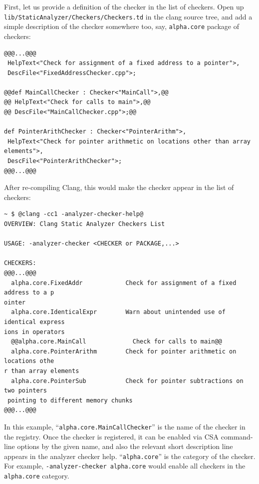 \documentclass[a4paper,12pt]{article}
\newenvironment{nobr}{\begin{minipage}{\textwidth}\setlength\parskip{1em}
}{\end{minipage}\ignorespacesafterend}
\begin{document}
\begin{nobr}
First, let us provide a definition of the checker in the list of checkers. Open up \lstinline|lib/StaticAnalyzer/Checkers/Checkers.td| in the clang source tree, and add a simple description of the checker somewhere too, say, \lstinline|alpha.core| package of checkers:
\begin{lstlisting}[style=commandline,title=\lstinline|@Checkers.td@|]
@@@...@@@
 HelpText<"Check for assignment of a fixed address to a pointer">,
 DescFile<"FixedAddressChecker.cpp">;

@@def MainCallChecker : Checker<"MainCall">,@@
@@ HelpText<"Check for calls to main">,@@
@@ DescFile<"MainCallChecker.cpp">;@@

def PointerArithChecker : Checker<"PointerArithm">,
 HelpText<"Check for pointer arithmetic on locations other than array elements">,
 DescFile<"PointerArithChecker">;
@@@...@@@
\end{lstlisting}
\end{nobr}

\begin{nobr}
After re-compiling Clang, this would make the checker appear in the list of checkers:
\begin{lstlisting}[style=commandline]
~ $ @clang -cc1 -analyzer-checker-help@
OVERVIEW: Clang Static Analyzer Checkers List

USAGE: -analyzer-checker <CHECKER or PACKAGE,...>

CHECKERS:
@@@...@@@
  alpha.core.FixedAddr            Check for assignment of a fixed address to a p
ointer
  alpha.core.IdenticalExpr        Warn about unintended use of identical express
ions in operators
  @@alpha.core.MainCall             Check for calls to main@@
  alpha.core.PointerArithm        Check for pointer arithmetic on locations othe
r than array elements
  alpha.core.PointerSub           Check for pointer subtractions on two pointers
 pointing to different memory chunks
@@@...@@@
\end{lstlisting}
\end{nobr}

In this example, ``\lstinline|alpha.core.MainCallChecker|'' is the name of the checker in the registry. Once the checker is registered, it can be enabled via CSA command-line options by the given name, and also the relevant short description line appears in the analyzer checker help. ``\lstinline|alpha.core|'' is the category of the checker. For example, \lstinline|-analyzer-checker alpha.core| would enable all checkers in the \lstinline|alpha.core| category.
\end{document}

